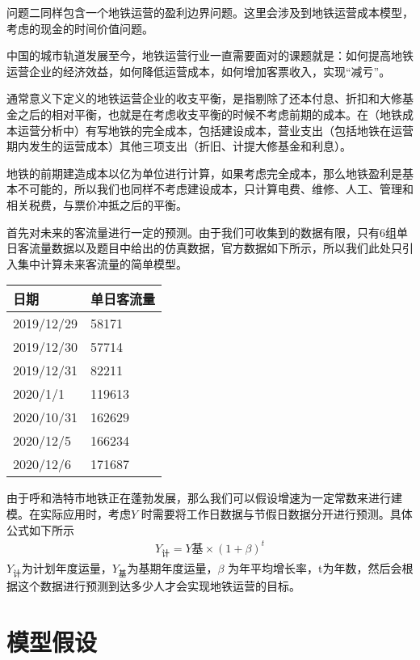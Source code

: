 \documentclass[12pt,a4paper]{mcmthesis}
\begin{document}
{问题二同样包含一个地铁运营的盈利边界问题。这里会涉及到地铁运营成本模型，考虑的现金的时间价值问题。}
{中国的城市轨道发展至今，地铁运营行业一直需要面对的课题就是：如何提高地铁运营企业的经济效益，如何降低运营成本，如何增加客票收入，实现“减亏”。

通常意义下定义的地铁运营企业的收支平衡，是指剔除了还本付息、折扣和大修基金之后的相对平衡，也就是在考虑收支平衡的时候不考虑前期的成本。在（地铁成本运营分析中）有写地铁的完全成本，包括建设成本，营业支出（包括地铁在运营期内发生的运营成本）其他三项支出（折旧、计提大修基金和利息）。

地铁的前期建造成本以亿为单位进行计算，如果考虑完全成本，那么地铁盈利是基本不可能的，所以我们也同样不考虑建设成本，只计算电费、维修、人工、管理和相关税费，与票价冲抵之后的平衡。}

 {首先对未来的客流量进行一定的预测。由于我们可收集到的数据有限，只有6组单日客流量数据以及题目中给出的仿真数据，官方数据如下所示，所以我们此处只引入集中计算未来客流量的简单模型。}
\begin{table}
    \centering
    \begin{tabular}{|l|l|}
    \hline
        日期 & 单日客流量 \\ \hline
        2019/12/29 & 58171 \\ \hline
        2019/12/30 & 57714 \\ \hline
        2019/12/31 & 82211 \\ \hline
        2020/1/1 & 119613 \\ \hline
        2020/10/31 & 162629 \\ \hline
        2020/12/5 & 166234 \\ \hline
        2020/12/6 & 171687 \\ \hline
    \end{tabular}
\end{table}
    由于呼和浩特市地铁正在蓬勃发展，那么我们可以假设增速为一定常数来进行建模。在实际应用时，考虑$Y$ 时需要将工作日数据与节假日数据分开进行预测。具体公式如下所示
    \begin{equation}
        \begin{aligned}
            Y_{计}=Y{基} \times (1+\beta)^t
            \end{aligned}
    \end{equation}
    $Y_{计}$为计划年度运量，$Y_{基}$为基期年度运量，$\beta$ 为年平均增长率，t为年数，然后会根据这个数据进行预测到达多少人才会实现地铁运营的目标。




\section{模型假设}
\end{document}
